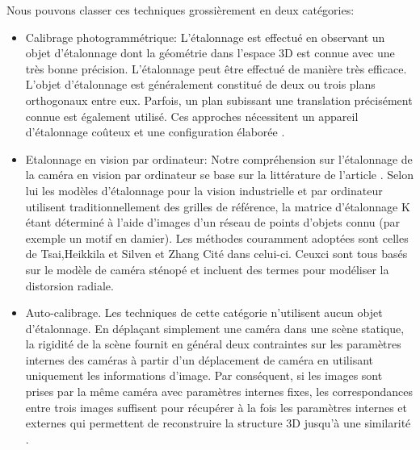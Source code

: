  Nous pouvons classer ces techniques grossièrement en deux catégories:\\
 \begin{itemize}
 \item Calibrage photogrammétrique: L'étalonnage est effectué en observant un objet d'étalonnage dont la géométrie dans l'espace 3D est connue avec une très bonne précision. L'étalonnage peut être effectué de manière très efficace. L'objet d'étalonnage est généralement constitué de deux ou trois plans orthogonaux entre eux. Parfois, un plan subissant une translation précisément connue est également utilisé. Ces approches nécessitent un appareil d'étalonnage coûteux et une configuration élaborée \cite{zhengyou_zhang_flexible_1999}.\\
 
 \item Etalonnage en vision par ordinateur: Notre compréhension sur l'étalonnage de la caméra en vision par ordinateur se base sur la littérature de l'article \cite{remondino_digital_2006}. Selon lui les modèles d'étalonnage pour la vision industrielle et par ordinateur utilisent traditionnellement des grilles de référence, la matrice d'étalonnage K étant déterminé à l'aide d'images d'un réseau de points d'objets connu (par exemple un motif en damier). Les méthodes couramment adoptées sont celles de Tsai,Heikkila et Silven  et Zhang \cite{zhengyou_zhang_flexible_1999} Cité dans celui-ci. Ceux­ci sont tous basés sur le modèle de caméra sténopé et incluent des termes pour modéliser la distorsion radiale.\\
 
 \item Auto-calibrage. Les techniques de cette catégorie n’utilisent aucun objet d’étalonnage. En déplaçant simplement une caméra dans une scène statique, la rigidité de la scène fournit en général deux contraintes sur les paramètres internes des caméras à partir d'un déplacement de caméra en utilisant uniquement les informations d'image. Par conséquent, si les images sont prises par la même caméra avec paramètres internes fixes, les correspondances entre trois images suffisent pour récupérer à la fois les paramètres internes et externes qui permettent de reconstruire la structure 3D jusqu'à une similarité \cite{zhengyou_zhang_flexible_1999}.\\
\end{itemize}

\newpage
